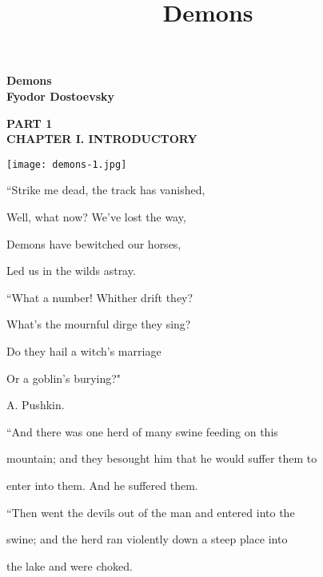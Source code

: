 \documentclass[12pt]{article}
\title{Demons}
\begin{document}
\thispagestyle{empty}
\begin{center}
\textbf{\Large Demons}\\
\textbf{Fyodor Dostoevsky}\\

\end{center}

\begin{center}
\textbf{\small PART 1\\ CHAPTER I. INTRODUCTORY}\\
\end{center}
\begin{center}
\texttt{[image: demons-1.jpg]}
\end{center}
{\scriptsize 

\vspace{12pt}
     ``Strike me dead, the track has vanished,

     Well, what now? We've lost the way,

     Demons have bewitched our horses,

     Led us in the wilds astray.



\vspace{12pt}
     ``What a number! Whither drift they?

     What's the mournful dirge they sing?

     Do they hail a witch's marriage

     Or a goblin's burying?"



\vspace{12pt}
     A. Pushkin.





\vspace{12pt}
     ``And there was one herd of many swine feeding on this

     mountain; and they besought him that he would suffer them to

     enter into them. And he suffered them.



\vspace{12pt}
     ``Then went the devils out of the man and entered into the

     swine; and the herd ran violently down a steep place into

     the lake and were choked.



}
\end{document}
